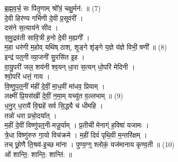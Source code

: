 ब्र॒ह्म॒व॒र्च॒ सः पि॑तृ॒णाम् श्रो᳚त्रं॒ चक्षु॒र्मन॑: ॥ (7)\\
दे॒वी हिर॑ण्य गर्भिणी दे॒वी प्र॒सूव॑री᳚ ।\\
दस॑ने स॒त्याय॑ने सीद ।\\
स॒मु॒द्रव॑ती सावि॒त्री ह॒नो दे॒वी म॒ह्यगी᳚ ।\\
म॒हा धर॑णी म॒होव् यथि॑ष् ठाश्, शृ॒ङ्गे शृ॑ङ्गे य॒ज्ञे य॑ज्ञे विभी॒ षणी᳚ ॥ (8)\\
इन्द्र॑ पत्॒नी व्या॒जनी॑ सु॒रसि॑त इ॒ह ।\\
वा॒यु॒परी॑ जल॒ शय॑नी {\small {}} श्व॒यन् धा॒रा स॒त्यन् धो॒परि॑ मेदिनी ।\\
श्वो॒परि॑ धत्तं॒ गाय ।\\
वि॒ष्णु॒प॒त्॒नीं म॑हीं दे॒वीं॒ मा॒ध॒वीं मा॑धव॒ प्रियाम् ।\\
लक्ष्मीं प्रि॒यस॑खीं दे॒वीं॒ न॒मा॒म् यच्यु॑त व॒ल्लभाम् ॥ (9)\\
ध॒नु॒र् ध॒रायै॑ वि॒द्महे॑ सर्व सि॒द्ध्यै च॑ धीमहि ।\\
तन्नो॑ धरा प्रचो॒दया᳚त् ।\\
म॒हीं दे॒वीं विष्णु॑पत्॒नी-मजू॒र्याम् । प्र॒तीची॑ मेनाग्ं ह॒विषा॑ यजामः ।\\
त्रे॒धा विष्णु॑रुरु गा॒यो विच॑क्रमे । म॒हीं दिवं॑ पृथि॒वी म॒न्तरि॑क्षम् ।\\
तच् छ्रो॒णै ति॒श्रव॑-इ॒च्छ मा॑ना । पुण्य॒ग्ग्॒ श्लोकं॒ यज॑मानाय कृण्व॒ती ॥ (10)\\
ओं शान्ति॒: शान्ति॒: शान्ति॑: ॥\\
